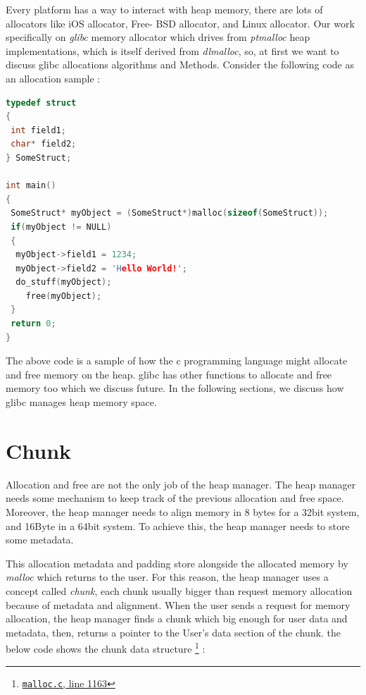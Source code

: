 \documentclass{masterthesis}
\newcommand*\libc{glibc}
\begin{document}
Every platform has a way to interact with heap memory, there are lots of allocators like iOS allocator, Free- BSD allocator, and Linux allocator. Our work specifically on \emph{ \libc{}} memory allocator which drives from \emph{ptmalloc} heap implementations, which is itself derived from \emph{dlmalloc}, so, at first we want to discuss \libc{} allocations algorithms and Methods. Consider the following code as an allocation sample : 

\begin{lstlisting}[language=c,frame=tlrb]
typedef struct 
{
 int field1;
 char* field2;
} SomeStruct;
 
int main()
{
 SomeStruct* myObject = (SomeStruct*)malloc(sizeof(SomeStruct));
 if(myObject != NULL)
 {
  myObject->field1 = 1234;
  myObject->field2 = 'Hello World!';
  do_stuff(myObject);
	free(myObject);
 }
 return 0;
}

\end{lstlisting}

The above code is a sample of how the c programming language might allocate and free memory on the heap. \libc{} has other functions to allocate and free memory too which we discuss future. In the following sections, we discuss how \libc{} manages heap memory space. 

\section{Chunk}

Allocation and free are not the only job of the heap manager. The heap manager needs some mechanism to keep track of the previous allocation and free space. Moreover, the heap manager needs to align memory in 8 bytes for a 32bit system, and 16Byte in a 64bit system. To achieve this, the heap manager needs to store some metadata.

This allocation metadata and padding store alongside the allocated memory by \emph{malloc} which returns to the user. For this reason, the heap manager uses a concept called \emph{chunk}, each chunk usually bigger than request memory allocation because of metadata and alignment. When the user sends a request for memory allocation, the heap manager finds a chunk which big enough for user data and metadata, then, returns a pointer to the User's data section of the chunk. the below code shows the chunk data structure \footnote{\href{https://sourceware.org/git/?p=glibc.git;a=blob;f=malloc/malloc.c;\#l1163}{\texttt{malloc.c}, line 1163}} :
\end{document}
